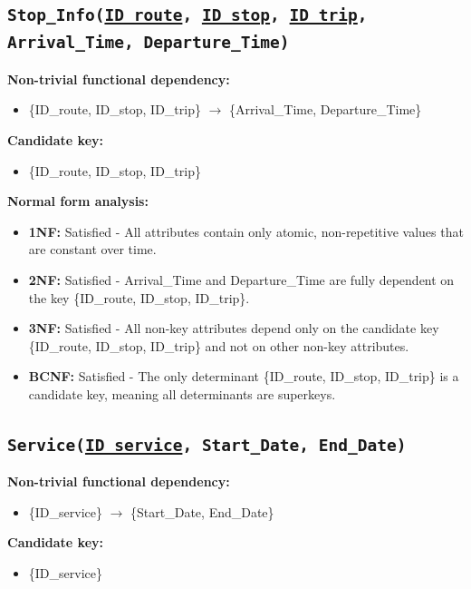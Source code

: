 \documentclass[a4paper, 12pt]{article}
\begin{document}
\subsection{\texttt{{Stop\_Info}(\underline{ID\_route}, \underline{ID\_stop}, \underline{ID\_trip}, Arrival\_Time, Departure\_Time)}}
\textbf{Non-trivial functional dependency:}
\begin{itemize}
    \item \{ID\_route, ID\_stop, ID\_trip\} $\rightarrow$ \{Arrival\_Time, Departure\_Time\}
\end{itemize}

\textbf{Candidate key:}
\begin{itemize}
    \item \{ID\_route, ID\_stop, ID\_trip\}
\end{itemize}

\textbf{Normal form analysis:}
\begin{itemize}
    \item \textbf{1NF:} Satisfied - All attributes contain only atomic, non-repetitive values that are constant over time.
    
    \item \textbf{2NF:} Satisfied - Arrival\_Time and Departure\_Time are fully dependent on the key \{ID\_route, ID\_stop, ID\_trip\}.
    
    \item \textbf{3NF:} Satisfied - All non-key attributes depend only on the candidate key \{ID\_route, ID\_stop, ID\_trip\} and not on other non-key attributes.
    
    \item \textbf{BCNF:} Satisfied - The only determinant \{ID\_route, ID\_stop, ID\_trip\} is a candidate key, meaning all determinants are superkeys.
\end{itemize}

\subsection{\texttt{{Service}(\underline{ID\_service}, Start\_Date, End\_Date)}}
\textbf{Non-trivial functional dependency:}
\begin{itemize}
    \item \{ID\_service\} $\rightarrow$ \{Start\_Date, End\_Date\}
\end{itemize}

\textbf{Candidate key:}
\begin{itemize}
    \item \{ID\_service\}
\end{itemize}
\end{document}
